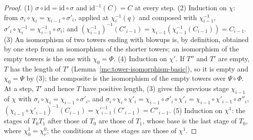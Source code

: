 \begin{proof}
\leanok
(1) \(\sigma\circ\mathrm{id}=\mathrm{id}\circ\sigma\) and \(\mathrm{id}^{-1}(C)=C\) at every step. (2) Induction on \(\chi\): from \(\sigma_i\circ\chi_i=\chi_{i-1}\circ\sigma'_i\), applied
at \(\chi_i^{-1}(q)\) and composed with \(\chi_{i-1}^{-1}\), \(\sigma'_i\circ\chi_i^{-1}=\chi_{i-1}^{-1}\circ\sigma_i\); and \((\chi_{i-1}^{-1})^{-1}(C'_{i-1})=\chi_{i-1}(\chi_{i-1}^{-1}(C_{i-1}))=C_{i-1}\).
(3) An isomorphism of two towers ending with blowups is, by definition, obtained by one step from an isomorphism of the shorter towers; an isomorphism of the
empty towers is the one with \(\chi_0=\Phi\). (4) Induction on \(\chi'\). If \(T''\) and \(T'\) are empty, \(T\) has the length of \(T'\) (Lemma~\ref{mc:tower-isomorphism-basic}), so
it is empty and \(\chi_0=\Psi\) by (3); the composite is the isomorphism of the empty towers over \(\Psi\circ\Phi\). At a step, \(T'\) and hence \(T\) have positive length, (3)
gives the previous stage \(\chi_{i-1}\) of \(\chi\) with \(\sigma_i\circ\chi_i=\chi_{i-1}\circ\sigma'_i\), and
\(\sigma_i\circ\chi_i\circ\chi'_i=\chi_{i-1}\circ\sigma'_i\circ\chi'_i=\chi_{i-1}\circ\chi'_{i-1}\circ\sigma''_i\), \((\chi_{i-1}\circ\chi'_{i-1})^{-1}(C_{i-1})=\chi'^{-1}_{i-1}(C'_{i-1})=C''_{i-1}\).
(5) Induction on \(\chi^1\): the stages of \(T_0T_1\) after those of \(T_0\) are those of \(T_1\), whose base is the last stage of \(T_0\), where \(\chi^1_0=\chi^0_r\); the
conditions at these stages are those of \(\chi^1\).
\end{proof}

